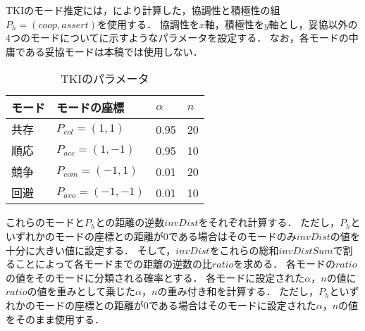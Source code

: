 TKIのモード推定には，により計算した，協調性と積極性の組$P_h = (coop, assert)$を使用する．
協調性を$x$軸，積極性を$y$軸とし，妥協以外の4つのモードについてに示すようなパラメータを設定する．
なお，各モードの中庸である妥協モードは本稿では使用しない．

\begin{table}[b]
    \centering
    \caption{TKIのパラメータ}
    \begin{tabular}{llll} \toprule
        モード & モードの座標 & $\alpha$ & $n$ \\ \midrule
        共存 & $P_{col} = (1, 1)$ & 0.95 & 20 \\
        順応 & $P_{acc} = (1, -1)$ & 0.95 & 10 \\
        競争 & $P_{com} = (-1, 1)$ & 0.01 & 20\\
        回避 & $P_{avo} = (-1, -1)$ & 0.01 & 10 \\ \bottomrule
    \end{tabular}
    \label{tab:tki-param}
\end{table}

これらのモードと$P_h$との距離の逆数$invDist$をそれぞれ計算する．
ただし，$P_h$といずれかのモードの座標との距離が0である場合はそのモードのみ$invDist$の値を十分に大きい値に設定する．
そして，$invDist$をこれらの総和$invDistSum$で割ることによって各モードまでの距離の逆数の比$ratio$を求める．
各モードの$ratio$の値をそのモードに分類される確率とする．
各モードに設定された$\alpha$，$n$の値に$ratio$の値を重みとして乗じた$\alpha$，$n$の重み付き和を計算する．
ただし，$P_h$といずれかのモードの座標との距離が0である場合はそのモードに設定された$\alpha$，$n$の値をそのまま使用する．

